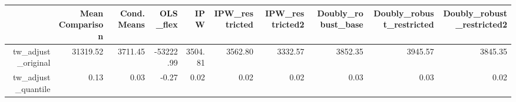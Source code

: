 \begin{table}[ht]
\centering
\begin{tabular}{rrrrrrrrrr}
  \hline
 & Mean Comparison & Cond. Means & OLS\_flex & IPW & IPW\_restricted & IPW\_restricted2 & Doubly\_robust\_base & Doubly\_robust\_restricted & Doubly\_robust\_restricted2 \\ 
  \hline
tw\_adjust\_original & 31319.52 & 3711.45 & -53222.99 & 3504.81 & 3562.80 & 3332.57 & 3852.35 & 3945.57 & 3845.35 \\ 
  tw\_adjust\_quantile & 0.13 & 0.03 & -0.27 & 0.02 & 0.02 & 0.02 & 0.03 & 0.03 & 0.02 \\ 
   \hline
\end{tabular}
\end{table}
